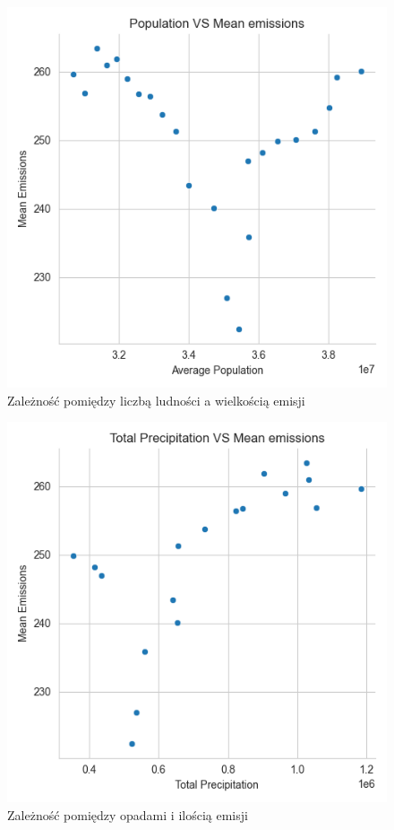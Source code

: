 \documentclass[9pt,a4paper,twoside]{rho}
\begin{document}
        \begin{figure}[H]
            \centering
            \includegraphics[width=1\columnwidth]{plots/Population VS Mean emissions.png}
            \caption{Zależność pomiędzy liczbą ludności a wielkością emisji}
            \label{fig:population_vs_emissions}
        \end{figure}
    
        \begin{figure}[H]
            \centering
            \includegraphics[width=1\columnwidth]{plots/Total Precipitation VS Mean emissions.png}
            \caption{Zależność pomiędzy opadami i ilością emisji}
            \label{fig:precipitation_vs_emissions}
        \end{figure}
\end{document}
